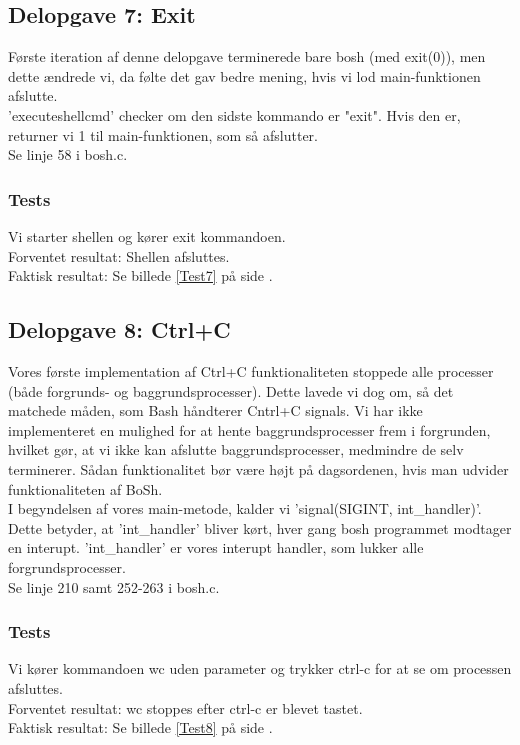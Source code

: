 \subsection{Delopgave 7: Exit}
\label{D7}
Første iteration af denne delopgave terminerede bare bosh (med exit(0)), men dette ændrede vi, da følte det gav bedre mening, hvis vi lod main-funktionen afslutte.
\\'executeshellcmd' checker om den sidste kommando er "exit". Hvis den er, returner vi 1 til main-funktionen, som så afslutter.
\\Se linje 58 i bosh.c.
\subsubsection{Tests}
Vi starter shellen og kører exit kommandoen.
\\Forventet resultat: Shellen afsluttes.
\\Faktisk resultat: Se billede \ref{Test7} på side \pageref{Test7}.

\subsection{Delopgave 8: Ctrl+C}
\label{D8}
Vores første implementation af Ctrl+C funktionaliteten stoppede alle processer (både forgrunds- og baggrundsprocesser). Dette lavede vi dog om, så det matchede måden, som Bash håndterer Cntrl+C signals. Vi har ikke implementeret en mulighed for at hente baggrundsprocesser frem i forgrunden, hvilket gør, at vi ikke kan afslutte baggrundsprocesser, medmindre de selv terminerer. Sådan funktionalitet bør være højt på dagsordenen, hvis man udvider funktionaliteten af BoSh.
\\I begyndelsen af vores main-metode, kalder vi 'signal(SIGINT, int\_handler)'. Dette betyder, at 'int\_handler' bliver kørt, hver gang bosh programmet modtager en interupt. 'int\_handler' er vores interupt handler, som lukker alle forgrundsprocesser. 
\\Se linje 210 samt 252-263 i bosh.c.
\subsubsection{Tests}
Vi kører kommandoen wc uden parameter og trykker ctrl-c for at se om processen afsluttes.
\\Forventet resultat: wc stoppes efter ctrl-c er blevet tastet.
\\Faktisk resultat: Se billede \ref{Test8} på side \pageref{Test8}.

